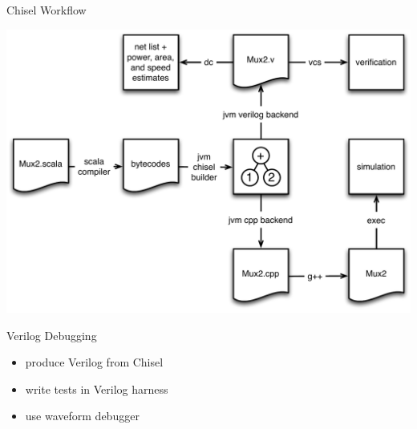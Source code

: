\documentclass[xcolor=pdflatex,dvipsnames,table]{beamer}
\begin{document}
\begin{frame}{Chisel Workflow}
\begin{center}
\includegraphics[height=0.9\textheight]{../bootcamp/figs/chisel-workflow.pdf}
\end{center}
\end{frame}

\begin{frame}{Verilog Debugging}
\begin{itemize}
\item produce Verilog from Chisel
\item write tests in Verilog harness
\item use waveform debugger
\end{itemize}
\end{frame}
\end{document}
